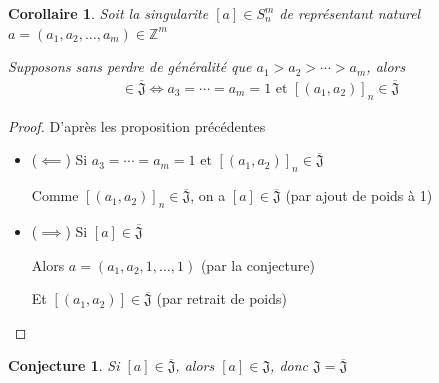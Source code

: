 \documentclass{article}
\newtheorem{conjecture}{Conjecture}
\newtheorem{corollary}{Corollaire}
\begin{document}
\begin{corollary}
    Soit la singularite $[a] \in S_n^m$ de représentant naturel $a = (a_1, a_2, \dots, a_m) \in \mathbb{Z}^m$

    Supposons sans perdre de généralité que $a_1 > a_2 > \cdots > a_m$, alors
    \begin{align*}
        [a] \in \overline{\mathfrak{J}} \iff a_3 = \cdots = a_m = 1 \text{ et } {[(a_1, a_2)]}_n \in \overline{\mathfrak{J}}
    \end{align*}
\end{corollary}

\begin{proof} D'après les proposition précédentes
    \begin{itemize}
        \item ($\impliedby$) Si $a_3 = \cdots = a_m = 1 \text{ et } {[(a_1, a_2)]}_n \in \overline{\mathfrak{J}}$
        
            Comme ${[(a_1, a_2)]}_n \in \overline{\mathfrak{J}}$, on a $[a] \in \overline{\mathfrak{J}}$ (par ajout de poids à 1)
        \item ($\implies$) Si $[a] \in \overline{\mathfrak{J}}$

            Alors $a = (a_1, a_2, 1, \dots, 1)$  (par la conjecture)

            Et $[(a_1, a_2)] \in \overline{\mathfrak{J}}$ (par retrait de poids)
    \end{itemize}
\end{proof}

\begin{conjecture}
    Si $[a] \in \overline{\mathfrak{J}}$, alors $[a] \in \mathfrak{J}$, donc $\mathfrak{J} = \overline{\mathfrak{J}}$
\end{conjecture}
\end{document}
